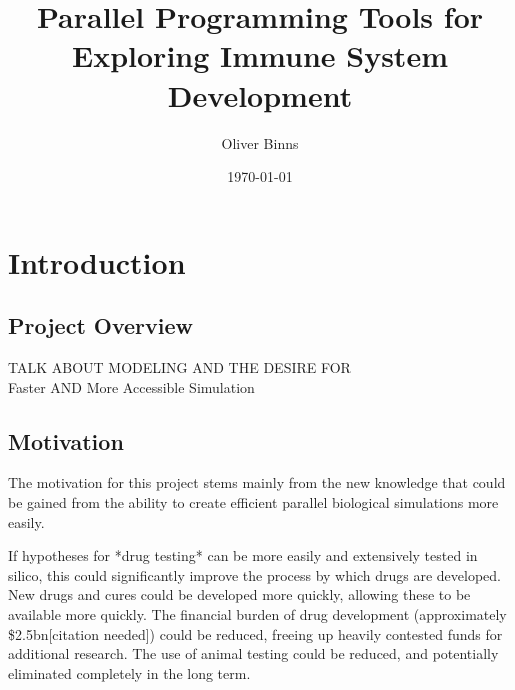 \documentclass{UoYCSproject}
\title{Parallel Programming Tools for Exploring Immune System Development}
\author{Oliver Binns}
\date{\today}
\begin{document}
\maketitle
\listoffigures
\listoftables
\renewcommand*{\lstlistlistingname}{List of Listings}
\lstlistoflistings

\chapter{Introduction}
\section{Project Overview}
TALK ABOUT MODELING AND THE DESIRE FOR 
\\
Faster AND More Accessible Simulation

\section{Motivation}
The motivation for this project stems mainly from the new knowledge that could be gained from the ability to create efficient parallel biological simulations more easily.

If hypotheses for *drug testing* can be more easily and extensively tested in silico, this could significantly improve the process by which drugs are developed.
New drugs and cures could be developed more quickly, allowing these to be available more quickly.
The financial burden of drug development (approximately \$2.5bn[citation needed]) could be reduced, freeing up heavily contested funds for additional research.
The use of animal testing could be reduced, and potentially eliminated completely in the long term.

\end{document}
